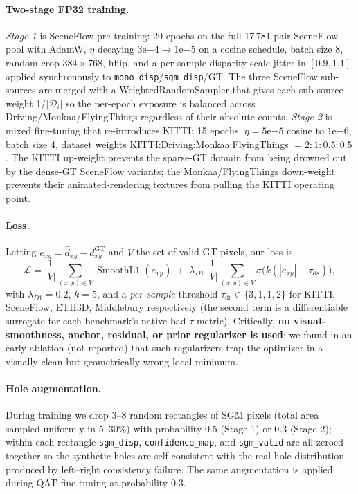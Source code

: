 \documentclass[journal]{IEEEtran}
\begin{document}
\paragraph{Two-stage FP32 training.} \emph{Stage 1} is SceneFlow pre-training: 20 epochs on the full 17\,781-pair SceneFlow pool with AdamW, $\eta$ decaying $3\mathrm{e}{-4}\!\to\!1\mathrm{e}{-5}$ on a cosine schedule, batch size 8, random crop $384\!\times\!768$, hflip, and a per-sample disparity-scale jitter in $[0.9, 1.1]$ applied synchronously to \texttt{mono\_disp}/\texttt{sgm\_disp}/GT. The three SceneFlow sub-sources are merged with a WeightedRandomSampler that gives each sub-source weight 1/$|\mathcal{D}_i|$ so the per-epoch exposure is balanced across Driving/Monkaa/FlyingThings regardless of their absolute counts. \emph{Stage 2} is mixed fine-tuning that re-introduces KITTI: 15 epochs, $\eta\!=\!5\mathrm{e}{-5}$ cosine to $1\mathrm{e}{-6}$, batch size 4, dataset weights KITTI:Driving:Monkaa:FlyingThings $=\!2{:}1{:}0.5{:}0.5$. The KITTI up-weight prevents the sparse-GT domain from being drowned out by the dense-GT SceneFlow variants; the Monkaa/FlyingThings down-weight prevents their animated-rendering textures from pulling the KITTI operating point.

\paragraph{Loss.} Letting $e_{xy}\!=\!\hat d_{xy}\!-\!d^{\text{GT}}_{xy}$ and $V$ the set of valid GT pixels, our loss is
\begin{equation}
\mathcal{L} = \frac{1}{|V|}\sum_{(x,y)\in V}\!\operatorname{SmoothL1}(e_{xy}) \;+\; \lambda_{D1}\,\frac{1}{|V|}\sum_{(x,y)\in V}\!\sigma\!\bigl(k(|e_{xy}|\!-\!\tau_{\mathrm{ds}})\bigr),
\label{eq:loss}
\end{equation}
with $\lambda_{D1}\!=\!0.2$, $k\!=\!5$, and a \emph{per-sample} threshold $\tau_{\mathrm{ds}}\!\in\!\{3, 1, 1, 2\}$ for KITTI, SceneFlow, ETH3D, Middlebury respectively (the second term is a differentiable surrogate for each benchmark's native bad-$\tau$ metric). Critically, \textbf{no visual-smoothness, anchor, residual, or prior regularizer is used}: we found in an early ablation (not reported) that such regularizers trap the optimizer in a visually-clean but geometrically-wrong local minimum.

\paragraph{Hole augmentation.} During training we drop 3--8 random rectangles of SGM pixels (total area sampled uniformly in 5--30\%) with probability 0.5 (Stage 1) or 0.3 (Stage 2); within each rectangle \texttt{sgm\_disp}, \texttt{confidence\_map}, and \texttt{sgm\_valid} are all zeroed together so the synthetic holes are self-consistent with the real hole distribution produced by left--right consistency failure. The same augmentation is applied during QAT fine-tuning at probability 0.3.
\end{document}
